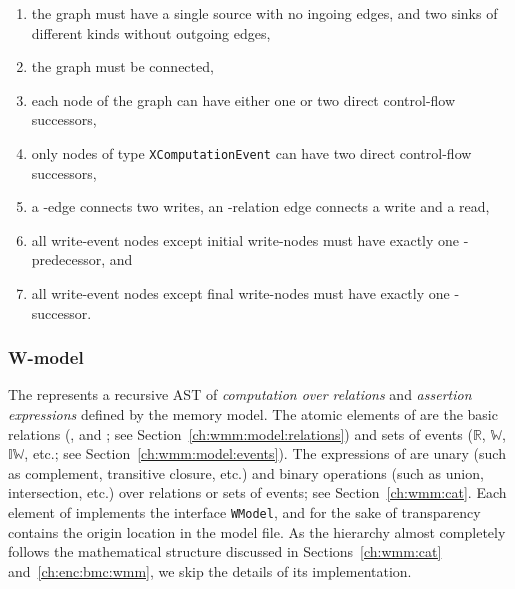 \begin{enumerate}[noitemsep]
\item the graph must have a single source with no ingoing edges, and two sinks of different kinds without outgoing edges,
\item the graph must be connected,
\item each node of the graph can have either one or two direct control-flow successors,
\item only nodes of type \texttt{XComputationEvent} can have two direct control-flow successors,
\item a \co{}-edge connects two writes, an \rf{}-relation edge connects a write and a read,
\item all write-event nodes except initial write-nodes must have exactly one \co-predecessor, and
\item all write-event nodes except final write-nodes must have exactly one \co-successor.
\end{enumerate}



\subsubsection{W-model}
\label{ch:impl:model:wmodel}

The \textit{\wmodel{}} represents a recursive AST of \textit{computation over relations} and \textit{assertion expressions} defined by the memory model.
The atomic elements of \wmodel{} are the basic relations (\po{}, \rf{} and \co{}; see Section~\ref{ch:wmm:model:relations}) and sets of events ($\mathbb{R}$, $\mathbb{W}$, $\mathbb{IW}$, etc.; see Section~\ref{ch:wmm:model:events}).
The expressions of \wmodel{} are unary (such as complement, transitive closure, etc.) and binary operations (such as union, intersection, etc.) over relations or sets of events; see Section~\ref{ch:wmm:cat}.
Each element of \wmodel{} implements the interface \texttt{WModel}, and for the sake of transparency contains the origin location in the model file. %
As the \wmodel{} hierarchy almost completely follows the mathematical structure discussed in Sections~\ref{ch:wmm:cat} and~\ref{ch:enc:bmc:wmm}, we skip the details of its implementation.


